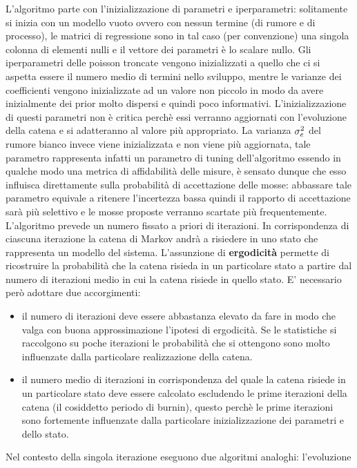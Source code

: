 L’algoritmo parte con l’inizializzazione di parametri e iperparametri: solitamente si
inizia con un modello vuoto ovvero con nessun termine (di rumore e di processo),
le matrici di regressione sono in tal caso (per convenzione) una singola colonna
di elementi nulli e il vettore dei parametri è lo scalare nullo. Gli iperparametri
delle poisson troncate vengono inizializzati a quello che ci si aspetta essere il numero medio di termini nello sviluppo, mentre le varianze dei coefficienti vengono
inizializzate ad un valore non piccolo in modo da avere inizialmente dei prior molto
dispersi e quindi poco informativi. L’inizializzazione di questi parametri non è critica perchè essi verranno aggiornati con l’evoluzione della catena e si adatteranno al
valore più appropriato. La varianza $\sigma_e^2$ del rumore bianco invece viene inizializzata
e non viene più aggiornata, tale parametro rappresenta infatti un parametro di tuning dell’algoritmo essendo in qualche modo una metrica di affidabilità delle misure,
è sensato dunque che esso influisca direttamente sulla probabilità di accettazione
delle mosse: abbassare tale parametro equivale a ritenere l’incertezza bassa quindi
il rapporto di accettazione sarà più selettivo e le mosse proposte verranno scartate
più frequentemente.
L’algoritmo prevede un numero fissato a priori di iterazioni. In corrispondenza di
ciascuna iterazione la catena di Markov andrà a risiedere in uno stato che rappresenta un modello del sistema. L’assunzione di \textbf{ergodicità} permette di ricostruire la probabilità che la catena risieda in un particolare stato a partire dal
numero di iterazioni medio in cui la catena risiede in quello stato. E’ necessario però
adottare due accorgimenti:
\begin{itemize}
\item il numero di iterazioni deve essere abbastanza elevato da fare in modo che valga
con buona approssimazione l’ipotesi di ergodicità. Se le statistiche si raccolgono su poche iterazioni le probabilità che si ottengono sono molto influenzate
dalla particolare realizzazione della catena.
\item il numero medio di iterazioni in corrispondenza del quale la catena risiede in
un particolare stato deve essere calcolato escludendo le prime iterazioni della
catena (il cosiddetto periodo di burnin), questo perchè
le prime iterazioni sono fortemente influenzate dalla particolare inizializzazione
dei parametri e dello stato.
\end{itemize}
Nel contesto della singola iterazione eseguono due algoritmi analoghi: l’evoluzione
